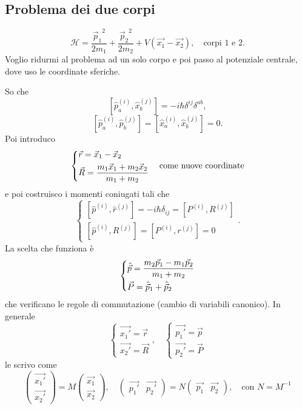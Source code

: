 \subsection{Problema dei due corpi}
\[
\mathcal{H} = \frac{{\vec{p}_1}^2}{2m_1} + \frac{{\vec{p}_2}^2}{2m_2} + V(\vec{x_1} - \vec{x_2}), \quad \text{corpi 1 e 2.}
\]
Voglio ridurmi al problema ad un solo corpo e poi passo al potenziale centrale, dove uso le coordinate sferiche.

So che
\[
[\hat{p}_a^{(i)}, \hat{x}_b^{(j)}] = -i\hbar \delta^{ij} \delta^{ab},
\]
\[
[\hat{p}_a^{(i)}, \hat{p}_b^{(j)}] = [\hat{x}_a^{(i)}, \hat{x}_b^{(j)}] = 0.
\]
Poi introduco
\[
\begin{dcases}
\vec{r} = \vec{x}_1 - \vec{x}_2 \\
\vec{R} = \frac{m_1 \vec{x}_1 + m_2 \vec{x}_2}{m_1 + m_2}
\end{dcases} \quad \text{come nuove coordinate}
\]
e poi costruisco i momenti coniugati tali che
\[
\begin{cases}
[\hat{p}^{(i)}, \hat{r}^{(j)}] = -i\hbar\delta_{ij} = [P^{(i)}, R^{(j)}] \\
[\hat{p}^{(i)}, R^{(j)}] = [P^{(i)}, r^{(j)}] = 0
\end{cases}.
\]
La scelta che funziona è
\[
\begin{dcases}
\hat{\vec{p}} = \frac{m_2 \vec{p}_1 - m_1 \vec{p}_2}{m_1 + m_2} \\
\vec{P} = \hat{\vec{p}}_1 + \hat{\vec{p}}_2
\end{dcases}
\]
che verificano le regole di commutazione (cambio di variabili canonico). In generale
\[
\begin{cases}
\vec{x_1'} = \vec{r} \\
\vec{x_2'} = \vec{R}
\end{cases}, \quad \begin{cases}
\vec{p_1'} = \vec{p} \\
\vec{p_2'} = \vec{P}
\end{cases}
\]
le scrivo come 
\[
\begin{pmatrix}
\vec{x_1'} \\
\vec{x_2'}
\end{pmatrix} = M \begin{pmatrix}
\vec{x_1} \\
\vec{x_2}
\end{pmatrix}, \quad \begin{pmatrix}
\vec{p_1'} & \vec{p_2'}
\end{pmatrix} = N \begin{pmatrix}
\vec{p_1} & \vec{p_2}
\end{pmatrix}, \quad \text{con } N = M^{-1}
\]
